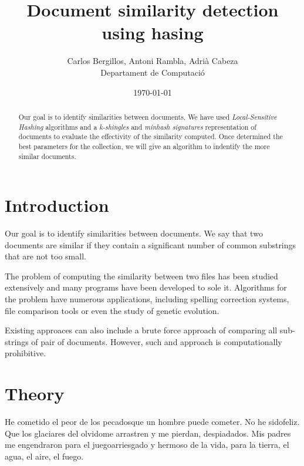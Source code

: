 \documentclass[12pt]{article}
\author{Carlos Bergillos, Antoni Rambla, Adrià Cabeza\\ Departament de Computació}
\title{Document similarity detection using hasing }
\date{\today}
\begin{document}
  \maketitle  

  \vspace{2cm}
	\begin{abstract}

Our goal is to identify similarities between documents. We have used \textit{Local-Sensitive Hashing} algorithms
 and a \textit{k-shingles} and \textit{minhash signatures} representation of documents to evaluate the effectivity of the similarity computed. Once determined the best parameters for the collection, we will give an algorithm to indentify the more similar documents. 
\end{abstract}

\newpage
\tableofcontents
\newpage

\section{Introduction}

Our goal is to identify similarities between documents. We say that two documents are similar if they contain a significant number of common substrings that are not too small. 

The problem of computing the similarity between two files has been studied extensively and many programs have been developed to sole it. Algorithms for the problem have numerous applications, including spelling correction systems, file comparison tools or even the study of genetic evolution.

 Existing approaces can also include a brute force approach of comparing all sub-strings of pair of documents. However, such and approach is computationally prohibitive. 



\section{Theory}

He cometido el peor de los pecadosque un hombre puede cometer. No he sidofeliz. Que los glaciares del olvidome arrastren y me pierdan, despiadados.
 Mis padres me engendraron para el juegoarriesgado y hermoso de la vida,
 para la tierra, el agua, el aire, el fuego.
 
\end{document}
